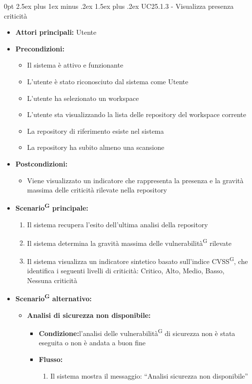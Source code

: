 \documentclass[a4paper, 11pt]{article}
\makeatletter
\renewcommand\paragraph{\@startsection{paragraph}{4}
  {0pt}
  {2.5ex plus 1ex minus .2ex}
  {1.5ex plus .2ex}
  {\normalfont\normalsize\bfseries\color{AccentDark}}}
\makeatother
\begin{document}
\paragraph{UC25.1.3 - Visualizza presenza criticità} \label{UC25.1.3}
\begin{itemize}
	\item \textbf{Attori principali:} Utente
	\item \textbf{Precondizioni:}
	\begin{itemize}
		\item Il sistema è attivo e funzionante
		\item L'utente è stato riconosciuto dal sistema come Utente
		\item L'utente ha selezionato un workspace
		\item L'utente sta visualizzando la lista delle repository del workspace corrente
		\item La repository di riferimento esiste nel sistema
		\item La repository ha subito almeno una scansione
	\end{itemize}
	\item \textbf{Postcondizioni:}
	\begin{itemize}
		\item Viene visualizzato un indicatore che rappresenta la presenza e la gravità massima delle criticità rilevate nella repository
	\end{itemize}
	\item \textbf{Scenario\textsuperscript{G} principale:}
	\begin{enumerate}
		\item Il sistema recupera l'esito dell'ultima analisi della repository
		\item Il sistema determina la gravità massima delle vulnerabilità\textsuperscript{G} rilevate
		\item Il sistema visualizza un indicatore sintetico basato sull'indice CVSS\textsuperscript{G}, che identifica i seguenti livelli di criticità: Critico, Alto, Medio, Basso, Nessuna criticità
	\end{enumerate}
		\item \textbf{Scenario\textsuperscript{G} alternativo:}
	\begin{itemize}
		\item \textbf{Analisi di sicurezza non disponibile:}
			\begin{itemize}
				\item \textbf{Condizione:}l'analisi delle vulnerabilità\textsuperscript{G} di sicurezza non è stata eseguita o non è andata a buon fine
				\item \textbf{Flusso:}
				\begin{enumerate}
					\item Il sistema mostra il messaggio: “Analisi sicurezza non disponibile”
				\end{enumerate}
			\end{itemize}
	\end{itemize}
\end{itemize}
\end{document}
